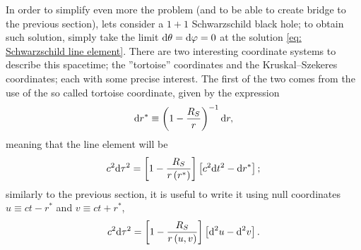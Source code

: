 In order to simplify even more the problem (and to be able to create bridge to the previous section), lets consider a $1+1$ Schwarzschild black hole; to obtain such solution, simply take the limit $\text{d}\theta=\text{d}\varphi=0$ at the solution \ref{eq: Schwarzschild line element}. There are two interesting coordinate systems to describe this spacetime; the ''tortoise'' coordinates and the Kruskal–Szekeres coordinates; each with some precise interest. The first of the two comes from the use of the so called tortoise coordinate, given by the expression
\begin{equation}\label{eq: Tortoise coordinate diff}
	\text{d} r^*\equiv \left(1-\frac{R_S}{r}\right)^{-1}\text{d} r,
\end{equation}
meaning that the line element will be
\begin{equation}
	c^2\text{d}\tau^2=\left[1-\frac{R_S}{r\left(r^*\right)}\right]\left[c^2\text{d} t^2-\text{d} r^*\right];
\end{equation}
similarly to the previous section, it is useful to write it using null coordinates $u\equiv ct-r^*$ and $v\equiv ct+r^*$,
\begin{equation}
	c^2\text{d}\tau^2=\left[1-\frac{R_S}{r\left(u,v\right)}\right]\left[\text{d}^2 u-\text{d}^2 v\right].
\end{equation}

